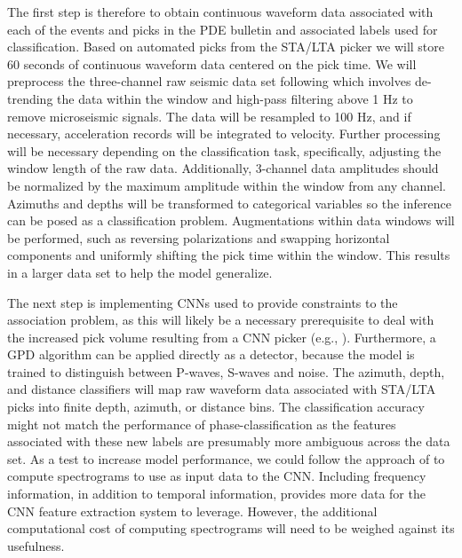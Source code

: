 \documentclass[12p]{article}
\begin{document}
The first step is therefore to obtain continuous waveform data associated with each of the events and picks in the PDE bulletin and associated labels used for classification. Based on automated picks from the STA/LTA picker we will store 60 seconds of continuous waveform data centered on the pick time. We will preprocess the three-channel raw seismic data set following \citep{Ross2018b} which involves de-trending the data within the window and high-pass filtering above 1 Hz to remove microseismic signals. The data will be resampled to 100 Hz, and if necessary, acceleration records will be integrated to velocity. Further processing will be necessary depending on the classification task, specifically, adjusting the window length of the raw data. Additionally, 3-channel data amplitudes should be normalized by the maximum amplitude within the window from any channel. Azimuths and depths will be transformed to categorical variables so the inference can be posed as a classification problem. Augmentations within data windows will be performed, such as reversing polarizations and swapping horizontal components and uniformly shifting the pick time within the window. This results in a larger data set to help the model generalize.

The next step is implementing CNNs used to provide constraints to the association problem, as this will likely be a necessary prerequisite to deal with the increased pick volume resulting from a CNN picker (e.g., \citep{Perol2018}). Furthermore, a GPD algorithm can be applied directly as a detector, because the model is trained to distinguish between P-waves, S-waves and noise. The azimuth, depth, and distance classifiers will map raw waveform data associated with STA/LTA picks into finite depth, azimuth, or distance bins. The classification accuracy might not match the performance of phase-classification as the features associated with these new labels are presumably more ambiguous across the data set. As a test to increase model performance, we could follow the approach of \citet{Zhu2019b} to compute spectrograms to use as input data to the CNN. Including frequency information, in addition to temporal information, provides more data for the CNN feature extraction system to leverage. However, the additional computational cost of computing spectrograms will need to be weighed against its usefulness.
\end{document}
